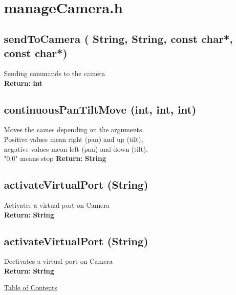 \documentclass[11pt, numbers=endperiod]{report}
\newcommand{\Vseparation}{\vspace{10mm}}
\newcommand{\setColor}[1]
			{\color{blue!}\textbf{#1}\color{black!}}
\newcommand\MySection[2][\DefaultOpt]{%
  \def\DefaultOpt{#2}%
  \color{cyan!}\section[#1]{#2}\color{black!}%
}
\begin{document}
\MySection{manageCamera.h}
\label{sec: manageCamera.h}
\begin{tcolorbox}[colback=white,colframe=cyan,width=\dimexpr\textwidth+12mm\relax,enlarge left by=-6mm]


\subsection*{sendToCamera ( String, String, const char*, const char*)}
Sending commands to the camera\\

\textbf{Return:} \setColor{int}
\Vseparation


\subsection*{continuousPanTiltMove (int, int, int)}
Moves the cames depending on the arguments.\\
Positive values mean right (pan) and up (tilt),\\
  negative values mean left (pan) and down (tilt),\\
	"0,0" means stop
\textbf{Return:} \setColor{String}
\Vseparation

\subsection*{activateVirtualPort (String)}
Activates a virtual port on Camera\\

\textbf{Return:} \setColor{String}
\Vseparation

\subsection*{activateVirtualPort (String)}
Dectivates a virtual port on Camera\\

\textbf{Return:} \setColor{String}
\Vseparation
\end{tcolorbox}



\hyperlink{toc}{Table of Contents}
\end{document}
